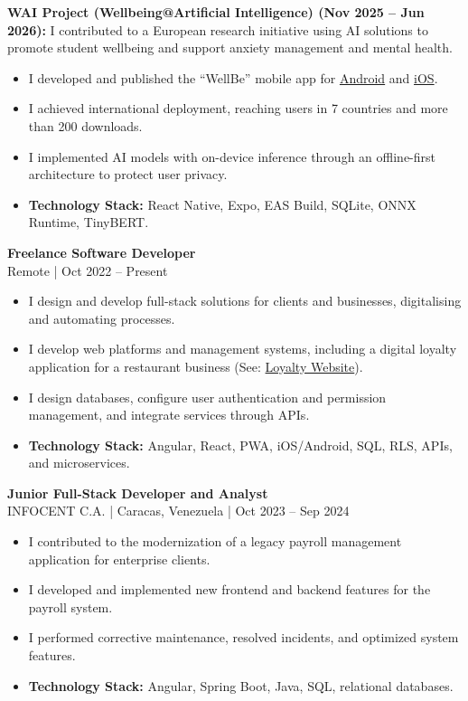 \documentclass[10pt,a4paper]{article}
\begin{document}
\vspace{5pt}
\textbf{WAI Project (Wellbeing@Artificial Intelligence) (Nov 2025 -- Jun 2026):} I contributed to a European research initiative using AI solutions to promote student wellbeing and support anxiety management and mental health.
\begin{itemize}
    \item I developed and published the ``WellBe'' mobile app for \href{https://play.google.com/store/apps/details?id=com.caloale.waiv1\&hl=en_US}{Android} and \href{https://apps.apple.com/ie/app/wellbe-journaling-app/id6758772082}{iOS}.
    \item I achieved international deployment, reaching users in 7 countries and more than 200 downloads.
    \item I implemented AI models with on-device inference through an offline-first architecture to protect user privacy.
    \item \textbf{Technology Stack:} React Native, Expo, EAS Build, SQLite, ONNX Runtime, TinyBERT.
\end{itemize}

\par\addvspace{\baselineskip}
\textbf{\large Freelance Software Developer}\\
Remote | Oct 2022 -- Present
\begin{itemize}
    \item I design and develop full-stack solutions for clients and businesses, digitalising and automating processes.
    \item I develop web platforms and management systems, including a digital loyalty application for a restaurant business (See: \href{https://avenidakebab.com/}{Loyalty Website}).
    \item I design databases, configure user authentication and permission management, and integrate services through APIs.
    \item \textbf{Technology Stack:} Angular, React, PWA, iOS/Android, SQL, RLS, APIs, and microservices.
\end{itemize}

\par\addvspace{\baselineskip}
\textbf{\large Junior Full-Stack Developer and Analyst}\\
INFOCENT C.A. | Caracas, Venezuela | Oct 2023 -- Sep 2024
\begin{itemize}
    \item I contributed to the modernization of a legacy payroll management application for enterprise clients.
    \item I developed and implemented new frontend and backend features for the payroll system.
    \item I performed corrective maintenance, resolved incidents, and optimized system features.
    \item \textbf{Technology Stack:} Angular, Spring Boot, Java, SQL, relational databases.
\end{itemize}
\end{document}

